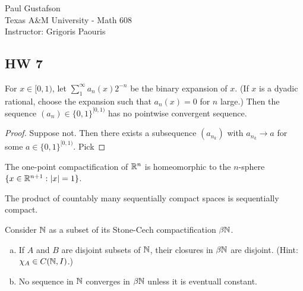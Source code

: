 \documentclass{article}
\begin{document}
\noindent Paul Gustafson\\
\noindent Texas A\&M University - Math 608 \\ 
\noindent Instructor: Grigoris Paouris

\subsection*{HW 7}

 For $x \in [0,1)$, let $\sum_1^\infty a_n(x) 2^{-n}$ be the binary expansion of $x$. 
(If $x$ is a dyadic rational, choose the expansion such that $a_n(x) = 0$ for $n$ large.) 
Then the sequence $(a_n) \in \{0, 1\}^{[0,1)}$ has no pointwise convergent sequence.
\begin{proof}
Suppose not. Then there exists a subsequence $(a_{n_k})$ with $a_{n_k} \to a$ for some
$a \in \{0,1\}^{[0,1)}$. Pick


\end{proof}


 The one-point compactification of $\mathbb{R}^n$ is homeomorphic to the $n$-sphere 
$\{ x \in \mathbb{R}^{n+1} : |x| = 1\}$.

 The product of countably many sequentially compact spaces is sequentially compact.


 Consider $\mathbb{N}$ as a subset of its Stone-Cech compactification $\beta\mathbb{N}$.
\begin{enumerate}[a.]
\item If $A$ and $B$ are disjoint subsets of $\mathbb{N}$, their closures in $\beta\mathbb{N}$ are disjoint. (Hint: $\chi_A \in C(\mathbb{N}, I)$.)
\item No sequence in $\mathbb{N}$ converges in $\beta\mathbb{N}$ unless it is eventuall constant.
\end{enumerate}
\end{document}
